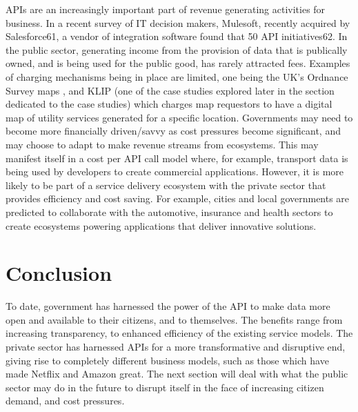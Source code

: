 APIs are an increasingly important part of revenue generating activities for business. In a recent survey of
IT decision makers, Mulesoft, recently acquired by Salesforce61, a vendor of integration software found that
50%
API initiatives62. In the public sector, generating income from the provision of data that is publically owned,
and is being used for the public good, has rarely attracted fees. Examples of charging mechanisms being in
place are limited, one being the UK’s Ordnance Survey maps , and KLIP (one of the case studies explored
later in the section dedicated to the case studies) which charges map requestors to have a digital map of
utility services generated for a specific location.
Governments may need to become more financially driven/savvy as cost pressures become significant, and
may choose to adapt to make revenue streams from ecosystems. This may manifest itself in a cost per API
call model where, for example, transport data is being used by developers to create commercial
applications. However, it is more likely to be part of a service delivery ecosystem with the private sector that
provides efficiency and cost saving. For example, cities and local governments are predicted to collaborate
with the automotive, insurance and health sectors to create ecosystems powering applications that deliver
innovative solutions.

\section{Conclusion}

To date, government has harnessed the power of the API to make data more open and available to their
citizens, and to themselves. The benefits range from increasing transparency, to enhanced efficiency of the
existing service models. The private sector has harnessed APIs for a more transformative and disruptive 
end, giving rise to completely different business models, such as those which have made Netflix and
Amazon great. The next section will deal with what the public sector may do in the future to disrupt itself in
the face of increasing citizen demand, and cost pressures.	
